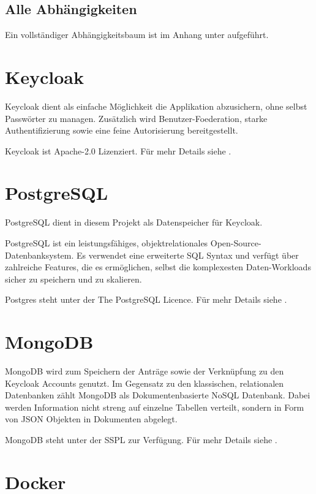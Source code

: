 \subsection{Alle Abhängigkeiten}
Ein vollständiger Abhängigkeitsbaum ist im Anhang unter  aufgeführt.

\section{Keycloak}\label{sec:keycloak}

Keycloak dient als einfache Möglichkeit die Applikation abzusichern, ohne selbst Passwörter zu managen.
Zusätzlich wird \gls{Benutzer-Foederation}, starke Authentifizierung sowie eine feine Autorisierung bereitgestellt.
\cite{about-keycloak}

Keycloak ist Apache-2.0 Lizenziert.
Für mehr Details siehe .

\section{PostgreSQL}\label{sec:postgres}

PostgreSQL dient in diesem Projekt als Datenspeicher für Keycloak.

PostgreSQL ist ein leistungsfähiges, objektrelationales Open-Source-Datenbanksystem.
Es verwendet eine erweiterte \ac{SQL} Syntax und verfügt über zahlreiche Features,
die es ermöglichen, selbst die komplexesten Daten-Workloads sicher zu speichern und zu skalieren.
\cite{about-postgres}

Postgres steht unter der The PostgreSQL Licence.
Für mehr Details siehe .


\section{MongoDB}\label{sec:mongodb}

MongoDB wird zum Speichern der Anträge sowie der Verknüpfung zu den Keycloak Accounts genutzt.
Im Gegensatz zu den klassischen, relationalen Datenbanken zählt MongoDB als Dokumentenbasierte NoSQL Datenbank.
Dabei werden Information nicht streng auf einzelne Tabellen verteilt, sondern in Form von \ac{JSON} Objekten in Dokumenten abgelegt.

MongoDB steht unter der \acl{SSPL} zur Verfügung.
Für mehr Details siehe .

\section{Docker}\label{sec:docker}

